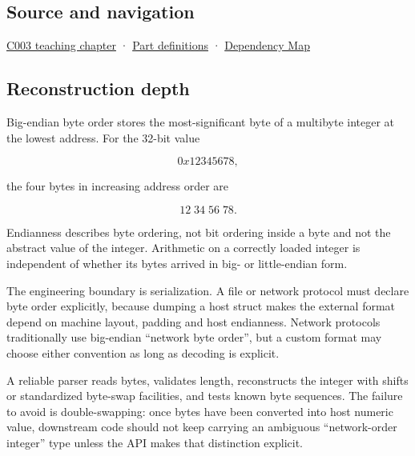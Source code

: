 \subsection{Source and navigation}\label{appendix-92e040df969a-source-and-navigation}

\hyperref[01-foundations-i-ch002-where-the-bytes-live]{C003 teaching chapter} · \hyperref[appendix-fd090d982a15-m003---parts-41-60]{Part definitions} · \hyperref[appendix-4ad47bdd269a]{Dependency Map}

\subsection{Reconstruction depth}\label{appendix-92e040df969a-reconstruction-depth}

Big-endian byte order stores the most-significant byte of a multibyte integer at the lowest address. For the 32-bit value

\[
0x12345678,
\]

the four bytes in increasing address order are

\[
12\;34\;56\;78.
\]

Endianness describes byte ordering, not bit ordering inside a byte and not the abstract value of the integer. Arithmetic on a correctly loaded integer is independent of whether its bytes arrived in big- or little-endian form.

The engineering boundary is serialization. A file or network protocol must declare byte order explicitly, because dumping a host struct makes the external format depend on machine layout, padding and host endianness. Network protocols traditionally use big-endian ``network byte order'', but a custom format may choose either convention as long as decoding is explicit.

A reliable parser reads bytes, validates length, reconstructs the integer with shifts or standardized byte-swap facilities, and tests known byte sequences. The failure to avoid is double-swapping: once bytes have been converted into host numeric value, downstream code should not keep carrying an ambiguous ``network-order integer'' type unless the API makes that distinction explicit.

